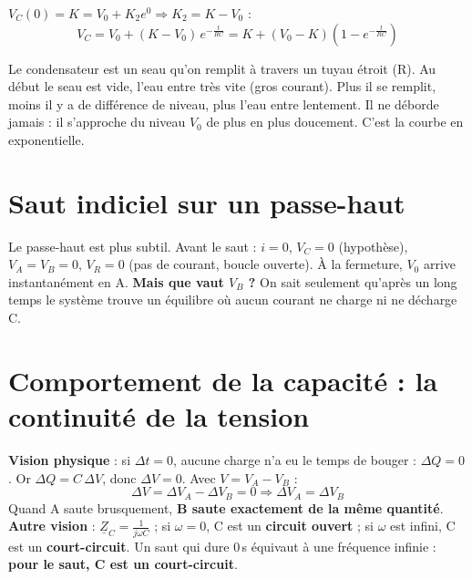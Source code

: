 \begin{thmbox}[title={Condition initiale différente : $V_C(0) = K$}]
$V_C(0) = K = V_0 + K_2 e^0 \Rightarrow K_2 = K - V_0$ :
\[ V_C = V_0 + (K - V_0)\,e^{-\frac t{RC}} = K + (V_0 - K)\left(1 - e^{-\frac t{RC}}\right) \]
\end{thmbox}

\begin{goatbox}
Le condensateur est un seau qu'on remplit à travers un tuyau étroit (R). Au début le seau
est vide, l'eau entre très vite (gros courant). Plus il se remplit, moins il y a de
différence de niveau, plus l'eau entre lentement. Il ne déborde jamais : il s'approche du
niveau $V_0$ de plus en plus doucement. C'est la courbe en exponentielle.
\end{goatbox}

\section{Saut indiciel sur un passe-haut}


Le passe-haut est plus subtil. Avant le saut : $i = 0$, $V_C = 0$ (hypothèse), $V_A = V_B = 0$,
$V_R = 0$ (pas de courant, boucle ouverte). À la fermeture, $V_0$ arrive instantanément en A.
\textbf{Mais que vaut $V_B$ ?} On sait seulement qu'après un long temps le système trouve un
équilibre où aucun courant ne charge ni ne décharge C.

\section{Comportement de la capacité : la continuité de la tension}


\begin{thmbox}[title={Continuité de la tension aux bornes d'un condensateur}]
\textbf{Vision physique} : si $\Delta t = 0$, aucune charge n'a eu le temps de bouger :
$\Delta Q = 0$. Or $\Delta Q = C\,\Delta V$, donc $\Delta V = 0$. Avec $V = V_A - V_B$ :
\[ \Delta V = \Delta V_A - \Delta V_B = 0 \Rightarrow \boxed{\Delta V_A = \Delta V_B} \]
Quand A saute brusquement, \textbf{B saute exactement de la même quantité}. \\
\textbf{Autre vision} : $\underline Z_C = \frac1{j\omega C}$ ; si $\omega = 0$, C est un
\textbf{circuit ouvert} ; si $\omega$ est infini, C est un \textbf{court-circuit}. Un saut qui
dure 0\,s équivaut à une fréquence infinie : \textbf{pour le saut, C est un court-circuit}.
\end{thmbox}

